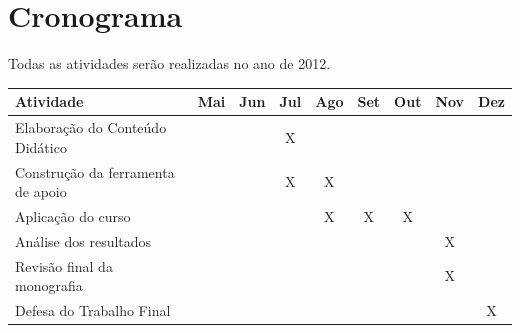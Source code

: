 \documentclass[pnumabnt,normaltoc,espacoumemeio,capchap]{abnt}
\begin{document}
\chapter{Cronograma}
\par Todas as atividades serão realizadas no ano de 2012.
\par
\begin{table}[htbp]
	\centering
\begin{tabular}{lcccccccc}
\hline
Atividade & Mai & Jun & Jul & Ago & Set & Out & Nov & Dez\\

\hline                                                
Elaboração do Conteúdo Didático &  &  & X &  &  &  &  & \\
\hline                                                
Construção da ferramenta de apoio &  &  & X & X &  &  &  & \\
\hline                                                
Aplicação do curso &  &  &  & X & X & X &  & \\
\hline
Análise dos resultados &  &  &  &  &  &  & X & \\
\hline                                                        
Revisão final da monografia &  &  &  &  &  &  & X & \\
\hline                                                       
Defesa do Trabalho Final &  &  &  &  &  &  &  & X\\
\hline
\end{tabular}
\end{table}
\normalsize



\end{document}
